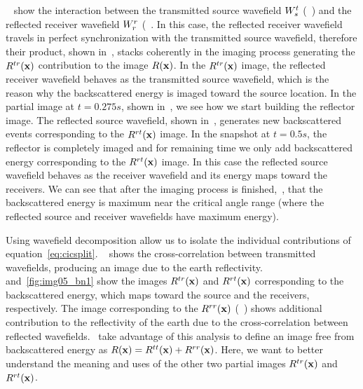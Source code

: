 ~ show the interaction between the transmitted source wavefield ${W_s^t}$ (~) and 
the reflected receiver wavefield ${W_r^r}$ (~. In this case, the reflected receiver wavefield travels in perfect synchronization
with the transmitted source wavefield, therefore their product, shown in~, stacks coherently in the imaging 
process generating the $R^{tr}({\bf x})$ contribution to the image $R({\bf x})$. In the $R^{tr}({\bf x})$ image, the reflected 
receiver wavefield behaves as the transmitted source wavefield, which is the reason why the backscattered energy is imaged toward the source location. 
%
%
 In the partial image at $t=0.275s$, shown in~, we see how we start building the reflector image.
 The reflected source wavefield, shown in~, generates new backscattered events
corresponding to the  $R^{rt}({\bf x})$ image.
%
%
In the snapshot at $t=0.5s$, the reflector is completely imaged and 
 for remaining time we only add backscattered energy corresponding to the $R^{rt}({\bf x})$ image. In this case the 
reflected source wavefield behaves as the receiver wavefield and its energy maps toward the receivers. We can see that after
 the imaging process is finished,~, that the backscattered energy is maximum near the critical
 angle range (where the reflected source and receiver wavefields have maximum energy).

Using wavefield decomposition allow us to isolate the individual contributions of equation~\ref{eq:cicsplit}. 
~ shows the cross-correlation between transmitted wavefields, producing an image due to the
earth reflectivity.~ and~\ref{fig:img05_bn1} show the images $R^{tr}({\bf x})$ and $R^{rt}({\bf x})$ corresponding
to the backscattered energy, which maps toward the source and the receivers, respectively. The image corresponding to the $R^{rr}({\bf x})$ 
(~) shows additional contribution to the reflectivity of the earth due to the cross-correlation
between reflected wavefields.~\cite{fei:3130} take  advantage of this analysis to define an image 
free from backscattered energy as $R({\bf x})=R^{tt}({\bf x})+R^{rr}({\bf x})$. Here,
we want to better understand the meaning and uses of the other two partial images $R^{tr}({\bf x})$ and $R^{rt}({\bf x})$.



